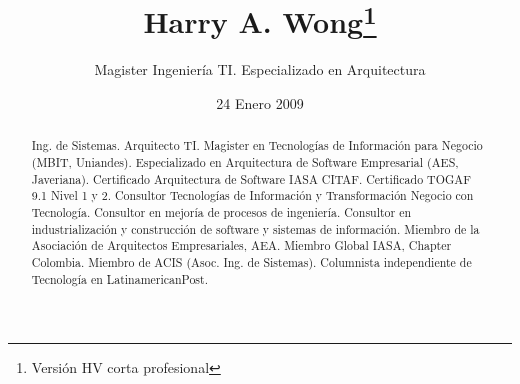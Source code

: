 \documentclass{tufte-handout}
\title{Harry A. Wong\thanks{Versión HV corta profesional}}
\author[Magister Ingeniería TI. Especializado en Arquitectura]{Magister
Ingeniería TI. Especializado en Arquitectura}
\date{24 Enero 2009}  %
\begin{document}
\maketitle %



\begin{abstract}
    
\noindent Ing. de Sistemas. Arquitecto TI. Magister en Tecnologías de
Información para Negocio (MBIT, Uniandes). Especializado en Arquitectura
de Software Empresarial (AES, Javeriana). Certificado Arquitectura de
Software IASA CITAF. Certificado TOGAF 9.1 Nivel 1 y 2. Consultor
Tecnologías de Información y Transformación Negocio con Tecnología.
Consultor en mejoría de procesos de ingeniería. Consultor en
industrialización y construcción de software y sistemas de información.
Miembro de la Asociación de Arquitectos Empresariales, AEA. Miembro
Global IASA, Chapter Colombia. Miembro de ACIS (Asoc. Ing. de Sistemas).
Columnista independiente de Tecnología en LatinamericanPost.
\end{abstract}
  
\end{document}
